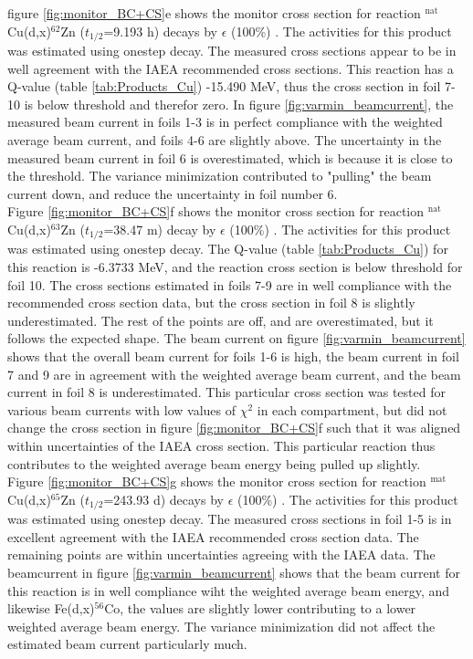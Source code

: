 \noindent
figure \ref{fig:monitor_BC+CS}e shows the monitor cross section for reaction $^\text{nat}$Cu(d,x)$^{62}$Zn ($t_{1/2}$=9.193 h) decays by $\epsilon$ (100\%) \cite{Nichols2012}. The activities for this product was estimated using onestep decay. The measured cross sections appear to be in well agreement with the IAEA recommended cross sections. This reaction has a Q-value (table \ref{tab:Products_Cu}) -15.490 MeV, thus the cross section in foil 7-10 is below threshold and therefor zero. In figure \ref{fig:varmin_beamcurrent}, the measured beam current in foils 1-3 is in perfect compliance with the weighted average beam current, and foils 4-6 are slightly above. The uncertainty in the measured beam current in foil 6 is overestimated, which is because it is close to the threshold. The variance minimization contributed to "pulling" the beam current down, and reduce the uncertainty in foil number 6. \\

\noindent 
Figure \ref{fig:monitor_BC+CS}f shows the monitor cross section for reaction $^\text{nat}$Cu(d,x)$^{63}$Zn ($t_{1/2}$=38.47 m) decay by $\epsilon$ (100\%) \cite{ERJUN2001}. The activities for this product was estimated using onestep decay. The Q-value (table \ref{tab:Products_Cu}) for this reaction is -6.3733 MeV, and the reaction cross section is below threshold for foil 10. The cross sections estimated in foils 7-9 are in well compliance with the recommended cross section data, but the cross section in foil 8 is slightly underestimated. The rest of the points are off, and are overestimated, but it follows the expected shape. The beam current on figure \ref{fig:varmin_beamcurrent} shows that the overall beam current for foils 1-6 is high, the beam current in foil 7 and 9 are in agreement with the weighted average beam current, and the beam current in foil 8 is underestimated. This particular cross section was tested for various beam currents with low values of $\chi^2$ in each compartment, but did not change the cross section in figure \ref{fig:monitor_BC+CS}f such that it was aligned within uncertainties of the IAEA cross section. This particular reaction thus contributes to the weighted average beam energy being pulled up slightly. \\

\newline 
Figure \ref{fig:monitor_BC+CS}g shows the monitor cross section for reaction $^\text{mat}$Cu(d,x)$^{65}$Zn ($t_{1/2}$=243.93 d) decays by $\epsilon$ (100\%) \cite{Browne2010}. The activities for this product was estimated using onestep decay. The measured cross sections in foil 1-5 is in excellent agreement with the IAEA recommended cross section data. The remaining points are within uncertainties agreeing with the IAEA data. The beamcurrent in figure \ref{fig:varmin_beamcurrent} shows that the beam current for this reaction is in well compliance wiht the weighted average beam energy, and likewise Fe(d,x)$^{56}$Co, the values are slightly lower contributing to a lower weighted average beam energy. The variance minimization did not affect the estimated beam current particularly much.  \\


